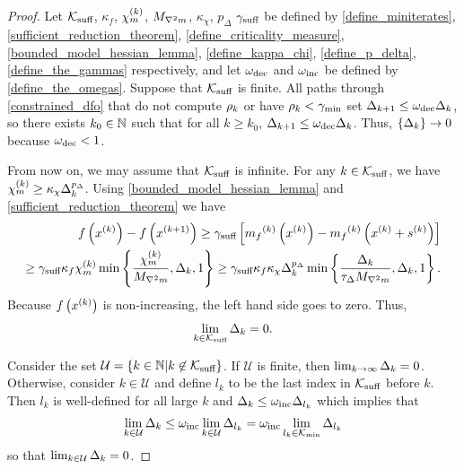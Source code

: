 \begin{proof}
Let
${\mathcal K_{\textrm{suff}}}$, $\kappa_f$, ${\chi_m^{(k)}}$, ${M_{\nabla^2 m}}$, $\kappa_{\chi}$, $p_{\Delta}$ $\gamma_{\textrm{suff}}$
be defined by
\cref{define_miniterates}, \cref{sufficient_reduction_theorem}, \cref{define_criticality_measure}, \cref{bounded_model_hessian_lemma}, \cref{define_kappa_chi}, \cref{define_p_delta}, \cref{define_the_gammas}
respectively,
and let $\omega_{\text{dec}}$ and $\omega_{\text{inc}}$ be defined by \cref{define_the_omegas}.
Suppose that ${\mathcal K_{\textrm{suff}}}$ is finite.
All paths through \cref{constrained_dfo} that do not compute $\rho_k$ or have $\rho_k < \gamma_{\textrm{min}}$ 
set $\Delta_{k+1} \le \omega_{\text{dec}} \Delta_k$, so there exists $k_0 \in \mathbb N$ such that for all $k \ge  k_0$, $\Delta_{k+1} \le \omega_{\text{dec}} \Delta_k$.
Thus, $\left\{\Delta_k\right\} \to 0$ because $\omega_{\text{dec}} < 1$.



From now on, we may assume that ${\mathcal K_{\textrm{suff}}}$ is infinite.  
For any $k \in {\mathcal K_{\textrm{suff}}}$, we have ${\chi_m^{(k)}} \ge \kappa_{\chi}\Delta_k^{p_{\Delta}}$.
Using \cref{bounded_model_hessian_lemma} and \cref{sufficient_reduction_theorem} we have
\begin{align*}
f\left(x^{(k)}\right) - f\left({{x}^{(k+1)}}\right) \ge \gamma_{\textrm{suff}} \left[{{m}_f}^{(k)}\left(x^{(k)}\right) - {{m}_f}^{(k)}\left(x^{(k)} + {{s}^{(k)}}\right)\right] \\
\ge \gamma_{\textrm{suff}} \kappa_f {\chi_m^{(k)}} \min\left\{\frac{{\chi_m^{(k)}}}{{M_{\nabla^2 m}}}, \Delta_k, 1\right\}
\ge \gamma_{\textrm{suff}} \kappa_f \kappa_{\chi}\Delta_k^{p_{\Delta}}\min\left\{\frac{\Delta_k}{\tau_{\Delta} {M_{\nabla^2 m}}}, \Delta_k, 1\right\}.
\end{align*}
% 
Because $f\left(x^{(k)}\right)$ is non-increasing, the left hand side goes to zero.
Thus,
\begin{align}
\lim_{k \in {\mathcal K_{\textrm{suff}}}} \Delta_k = 0.
\end{align}

Consider the set
$\mathcal U = \{ k \in \mathbb N | k \not \in {\mathcal K_{\textrm{suff}}} \}$.
If $\mathcal U$ is finite, then $\lim_{k\to\infty}\Delta_k = 0$.
Otherwise, consider $k \in \mathcal U$ and define $l_k$ to be the last index in ${\mathcal K_{\textrm{suff}}}$ before $k$.
Then $l_k$ is well-defined for all large $k$  and $\Delta_k \le \omega_{\text{inc}} \Delta_{l_k}$ which implies that
\begin{align}
\lim_{k \in \mathcal U } \Delta_k \le \omega_{\text{inc}} \lim_{k \in \mathcal U} \Delta_{l_k} = \omega_{\text{inc}} \lim_{l_k \in {\mathcal K_{\textrm{min}}}} \Delta_{l_k}
\end{align}
so that $\lim_{k \in \mathcal U} \Delta_k = 0$.
\end{proof}


